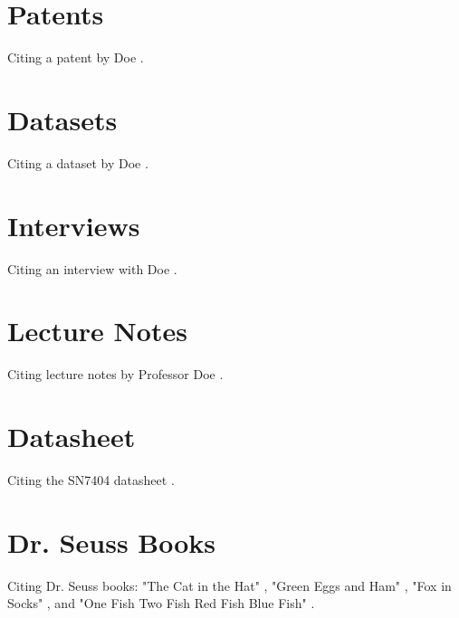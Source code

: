 \documentclass{article}
\begin{document}
\section{Patents}
Citing a patent by Doe \cite{doe2021_patent}.

\section{Datasets}
Citing a dataset by Doe \cite{doe2020_dataset}.

\section{Interviews}
Citing an interview with Doe \cite{doe2021_interview}.

\section{Lecture Notes}
Citing lecture notes by Professor Doe \cite{doe2021_lecture}.

\section{Datasheet}
Citing the SN7404 datasheet \cite{sn7404_datasheet}.

\section{Dr. Seuss Books}
Citing Dr. Seuss books: "The Cat in the Hat" \cite{seuss_cat_hat}, "Green Eggs and Ham" \cite{seuss_green_eggs}, "Fox in Socks" \cite{seuss_fox_sox}, and "One Fish Two Fish Red Fish Blue Fish" \cite{seuss_one_fish}.

\printbibliography
\end{document}
